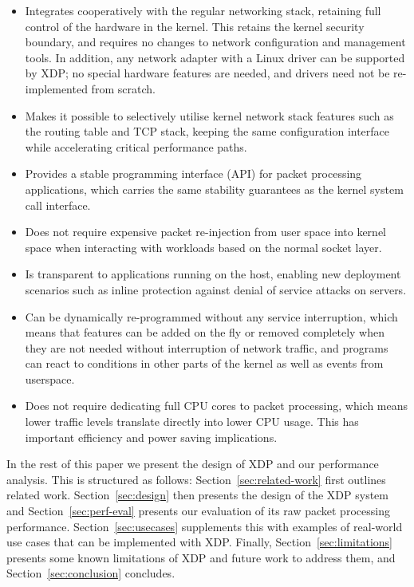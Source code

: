 \documentclass[sigconf]{acmart}
\begin{document}
\begin{itemize}
\item Integrates cooperatively with the regular networking stack, retaining full
  control of the hardware in the kernel. This retains the kernel security
  boundary, and requires no changes to network configuration and management
  tools. In addition, any network adapter with a Linux driver can be supported
  by XDP; no special hardware features are needed, and drivers need not be
  re-implemented from scratch.

\item Makes it possible to selectively utilise kernel network stack features
  such as the routing table and TCP stack, keeping the same configuration
  interface while accelerating critical performance paths.

\item Provides a stable programming interface (API) for packet processing
  applications, which carries the same stability guarantees as the kernel system
  call interface.

\item Does not require expensive packet re-injection from user space into kernel
  space when interacting with workloads based on the normal socket layer.

\item Is transparent to applications running on the host, enabling new
  deployment scenarios such as inline protection against denial of service
  attacks on servers.

\item Can be dynamically re-programmed without any service interruption, which
  means that features can be added on the fly or removed completely when they
  are not needed without interruption of network traffic, and programs can
  react to conditions in other parts of the kernel as well as events from
  userspace.

\item Does not require dedicating full CPU cores to packet processing, which
  means lower traffic levels translate directly into lower CPU usage. This has
  important efficiency and power saving implications.
\end{itemize}

In the rest of this paper we present the design of XDP and our performance
analysis. This is structured as follows: Section~\ref{sec:related-work} first
outlines related work. Section~\ref{sec:design} then presents the design of the
XDP system and Section~\ref{sec:perf-eval} presents our evaluation of its raw
packet processing performance. Section~\ref{sec:usecases} supplements this with
examples of real-world use cases that can be implemented with XDP. Finally,
Section~\ref{sec:limitations} presents some known limitations of XDP and future
work to address them, and Section~\ref{sec:conclusion} concludes.
\end{document}
